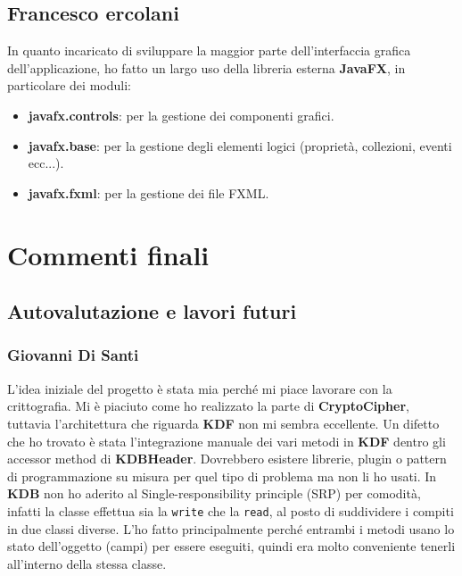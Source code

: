 \documentclass[a4paper,12pt]{report}
\begin{document}
\section*{Francesco ercolani}
In quanto incaricato di sviluppare la maggior parte dell'interfaccia grafica dell'applicazione, ho fatto un largo uso della libreria esterna \textbf{JavaFX}, in particolare dei moduli:
\begin{itemize}
    \item \textbf{javafx.controls}: per la gestione dei componenti grafici.
    \item \textbf{javafx.base}: per la gestione degli elementi logici (proprietà, collezioni, eventi ecc...).
    \item \textbf{javafx.fxml}: per la gestione dei file FXML.
\end{itemize}

\chapter{Commenti finali}

\section{Autovalutazione e lavori futuri}

\subsection*{Giovanni Di Santi}

L'idea iniziale del progetto è stata mia perché mi piace lavorare con la crittografia.
Mi è piaciuto come ho realizzato la parte di \textbf{CryptoCipher}, tuttavia l'architettura
che riguarda \textbf{KDF} non mi sembra eccellente. Un difetto che ho trovato
è stata l'integrazione manuale dei vari metodi in \textbf{KDF} dentro gli accessor
method di \textbf{KDBHeader}.  Dovrebbero esistere librerie, plugin o pattern di
programmazione su misura per quel tipo di problema ma non li ho usati.
In \textbf{KDB} non ho aderito al Single-responsibility principle (SRP) per comodità,
infatti la classe effettua sia la \texttt{write} che la \texttt{read}, al posto di suddividere
i compiti in due classi diverse. L'ho fatto principalmente perché entrambi i metodi
usano lo stato dell'oggetto (campi) per essere eseguiti, quindi era molto conveniente
tenerli all'interno della stessa classe.
\end{document}
